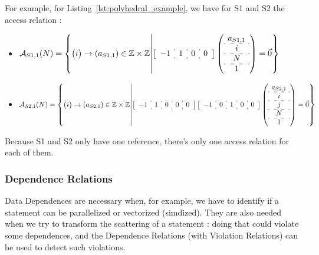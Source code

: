 \documentclass[paper=a4, fontsize=11pt]{scrartcl}
\numberwithin{equation}{section}        %
\numberwithin{figure}{section}          %
\numberwithin{table}{section}               %
\begin{document}
        For example, for Listing~\ref{lst:polyhedral_example}, we have for S1 and S2 the
        access relation :
        \begin{itemize}
            \item[]
                $
                \mathcal{A}_{S1,1}(N) = 
                \left\{
                \begin{pmatrix}i\end{pmatrix} \to \left(a_{S1,1}\right) \in \mathbb{Z}\times\mathbb{Z}
                    \middle|
                    \left[\begin{array}{c:c:c:c}-1 & 1 & 0 & 0 \end{array}\right]
                    \left(\begin{array}{c}a_{S1,1}\\\hdashline i\\\hdashline N\\\hdashline 1\end{array}\right)
                    = \vec{0}
                \right\}
                $
            
            \item[]
                $
                \mathcal{A}_{S2,1}(N) = 
                \left\{
                \begin{pmatrix}i\end{pmatrix} \to \left(a_{S2,1}\right) \in \mathbb{Z}\times\mathbb{Z}
                    \middle|
                    \left[\begin{array}{c:c:c:c:c}-1 & 1 & 0 & 0 & 0 \end{array}\right]
                    \left[\begin{array}{c:c:c:c:c}-1 & 0 & 1 & 0 & 0 \end{array}\right]
                    \left(\begin{array}{c}a_{S2,1}\\\hdashline i\\\hdashline j\\\hdashline N\\\hdashline 1\end{array}\right)
                    = \vec{0}
                \right\}
                $
        \end{itemize}

        Because S1 and S2 only have one reference, there's only one access relation for
        each of them.

    \subsubsection{Dependence Relations}
        Data Dependences are necessary when, for example, we have to identify if a statement
        can be parallelized or vectorized (simdized). They are also needed when we try to
        transform the scattering of a statement : doing that could violate some dependences,
        and the Dependence Relations (with Violation Relations) can be used to detect such
        violations.
\end{document}
